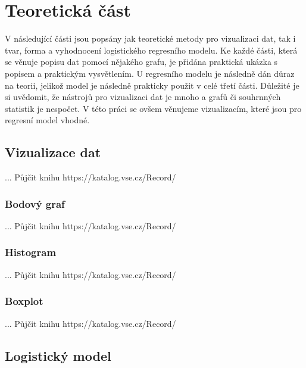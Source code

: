 \chapter{Teoretická část}
V následující části jsou popsány jak teoretické metody pro vizualizaci dat, tak i tvar, forma a vyhodnocení logistického regresního modelu. 
Ke každé části, která se věnuje popisu dat pomocí nějakého grafu, je přidána praktická ukázka s popisem a praktickým vysvětlením. U regresního 
modelu je následně dán důraz na teorii, jelikož model je následně prakticky použit v celé třetí části. Důležité je si uvědomit, že nástrojů pro
vizualizaci dat je mnoho a grafů či souhrnných statistik je nespočet. V této práci se ovšem věnujeme vizualizacím, které jsou pro regresní model
vhodné.
\section{Vizualizace dat}
... Půjčit knihu https://katalog.vse.cz/Record/

\subsection{Bodový graf}
... Půjčit knihu https://katalog.vse.cz/Record/

\subsection{Histogram}
... Půjčit knihu https://katalog.vse.cz/Record/

\subsection{Boxplot}
... Půjčit knihu https://katalog.vse.cz/Record/
\newpage
\section{Logistický model}
